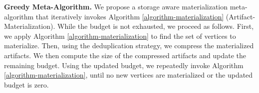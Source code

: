 \textbf{Greedy Meta-Algorithm.}
We propose a storage aware materialization meta-algorithm that iteratively invokes Algorithm \ref{algorithm-materialization} (Artifact-Materialization).
While the budget is not exhausted, we proceed as follows.
First, we apply Algorithm \ref{algorithm-materialization} to find the set of vertices to materialize.
Then, using the deduplication strategy, we compress the materialized artifacts.
We then compute the size of the compressed artifacts and update the remaining budget.
Using the updated budget, we repeatedly invoke Algorithm \ref{algorithm-materialization}, until no new vertices are materialized or the updated budget is zero.

